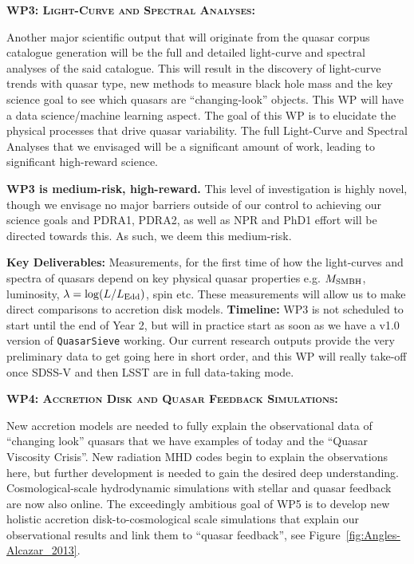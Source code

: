 \medskip 
\medskip
\smallskip
\smallskip
\noindent
\textbf{\textsc{WP3: Light-Curve and Spectral Analyses:}} 

\smallskip
\smallskip
\noindent
Another major scientific output that will originate from the quasar
corpus catalogue generation will be the full and detailed light-curve
and spectral analyses of the said catalogue. This will result in the
discovery of light-curve trends with quasar type, new methods to
measure black hole mass and the key science goal to see which quasars
are ``changing-look'' objects. This WP will have a data
science/machine learning aspect.  The goal of this WP is to elucidate
the physical processes that drive quasar variability.  The full
Light-Curve and Spectral Analyses that we envisaged will be a
significant amount of work, leading to significant high-reward
science.  

\smallskip
\smallskip
\noindent
{\bf WP3 is medium-risk, high-reward.}  
This level of investigation is highly novel, though we envisage no
major barriers outside of our control to achieving our science goals
and PDRA1, PDRA2, as well as NPR and PhD1 effort will be
directed towards this. As such, we deem this medium-risk. 

\smallskip
\smallskip
\noindent
 {\bf Key Deliverables:}
Measurements, for the first time of how the light-curves and spectra
of quasars depend on key physical quasar properties e.g. $M_{\rm
SMBH}$, luminosity, $\lambda = \log (L / L_{\rm Edd})$, spin etc.
These measurements will allow us to make direct comparisons to
accretion disk models.  {\bf Timeline:} WP3 is not scheduled to 
start until the end of Year 2, but will in practice start as soon as
we have a v1.0 version of {\tt QuasarSieve} working. Our current 
research outputs provide the very preliminary data to get going 
here in short order, and this WP will really take-off once SDSS-V
and then LSST are in full data-taking mode. 



\medskip 
\medskip
\smallskip
\smallskip
\noindent
\textbf{\textsc{WP4: Accretion Disk and Quasar Feedback Simulations:}} 

\smallskip
\smallskip
\noindent
New accretion models are needed to fully explain the observational
data of ``changing look'' quasars that we have examples of today and
the ``Quasar Viscosity Crisis''. New radiation MHD codes begin to
explain the observations here, but further development is needed to
gain the desired deep understanding. Cosmological-scale hydrodynamic
simulations with stellar and quasar feedback are now also online. The
exceedingly ambitious goal of WP5 is to develop new holistic accretion
disk-to-cosmological scale simulations that explain our observational
results and link them to ``quasar feedback'', see Figure~\ref{fig:Angles-Alcazar_2013}.

